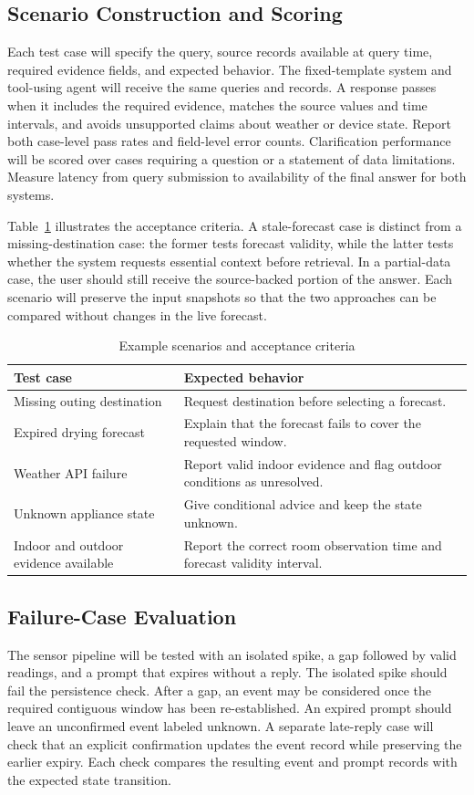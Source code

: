 \documentclass[conference]{IEEEtran}
\begin{document}
\subsection{Scenario Construction and Scoring}
Each test case will specify the query, source records available at query time, required evidence fields, and expected behavior. The fixed-template system and tool-using agent will receive the same queries and records. A response passes when it includes the required evidence, matches the source values and time intervals, and avoids unsupported claims about weather or device state. Report both case-level pass rates and field-level error counts. Clarification performance will be scored over cases requiring a question or a statement of data limitations. Measure latency from query submission to availability of the final answer for both systems.

Table~\ref{tab:scenarios} illustrates the acceptance criteria. A stale-forecast case is distinct from a missing-destination case: the former tests forecast validity, while the latter tests whether the system requests essential context before retrieval. In a partial-data case, the user should still receive the source-backed portion of the answer. Each scenario will preserve the input snapshots so that the two approaches can be compared without changes in the live forecast.

\begin{table}[t]
\caption{Example scenarios and acceptance criteria}
\label{tab:scenarios}
\centering\footnotesize
\begin{tabular}{@{}p{}p{}@{}}
\hline
Test case & Expected behavior \\
\hline
Missing outing destination & Request destination before selecting a forecast. \\
Expired drying forecast & Explain that the forecast fails to cover the requested window. \\
Weather API failure & Report valid indoor evidence and flag outdoor conditions as unresolved. \\
Unknown appliance state & Give conditional advice and keep the state unknown. \\
Indoor and outdoor evidence available & Report the correct room observation time and forecast validity interval. \\
\hline
\end{tabular}
\end{table}

\subsection{Failure-Case Evaluation}
The sensor pipeline will be tested with an isolated spike, a gap followed by valid readings, and a prompt that expires without a reply. The isolated spike should fail the persistence check. After a gap, an event may be considered once the required contiguous window has been re-established. An expired prompt should leave an unconfirmed event labeled unknown. A separate late-reply case will check that an explicit confirmation updates the event record while preserving the earlier expiry. Each check compares the resulting event and prompt records with the expected state transition.
\end{document}
